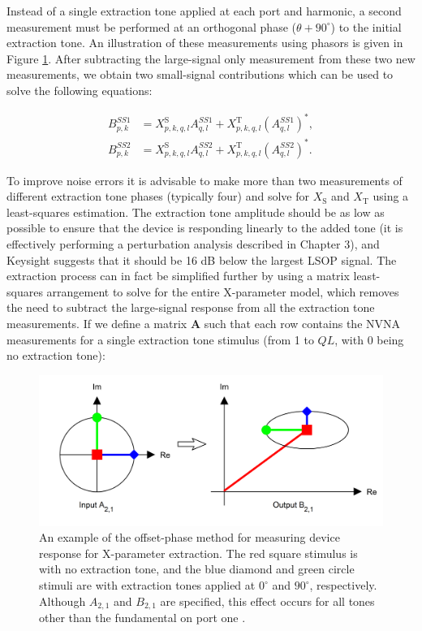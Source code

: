 \documentclass[../thesis/thesis.tex]{subfiles}
\begin{document}
\begin{refsection}
Instead of a single extraction tone applied at each port and harmonic, a second measurement must be performed at an orthogonal phase ($\theta+90^{\circ}$) to the initial extraction tone. An illustration of these measurements using phasors is given in Figure \ref{ch5_fig_extract}. After subtracting the large-signal only measurement from these two new measurements, we obtain two small-signal contributions which can be used to solve the following equations:

\begin{align}
	B^{SS1}_{p,k} &= X^\textrm{S}_{p,k,q,l}A^{SS1}_{q,l} + X^\textrm{T}_{p,k,q,l}(A^{SS1}_{q,l})^*, \\
	B^{SS2}_{p,k} &= X^\textrm{S}_{p,k,q,l}A^{SS2}_{q,l} + X^\textrm{T}_{p,k,q,l}(A^{SS2}_{q,l})^*.
\end{align}

To improve noise errors it is advisable to make more than two measurements of different extraction tone phases (typically four) and solve for $X_\textrm{S}$ and $X_\textrm{T}$ using a least-squares estimation. The extraction tone amplitude should be as low as possible to ensure that the device is responding linearly to the added tone (it is effectively performing a perturbation analysis described in Chapter 3), and Keysight suggests that it should be 16 dB below the largest LSOP signal. The extraction process can in fact be simplified further by using a matrix least-squares arrangement to solve for the entire X-parameter model, which removes the need to subtract the large-signal response from all the extraction tone measurements. If we define a matrix $\bm{A}$ such that each row contains the NVNA measurements for a single extraction tone stimulus (from 1 to $QL$, with 0 being no extraction tone):

\begin{figure}
	\centering
	\includegraphics[width=\textwidth]{extract}
	\caption[Offset-phase X-parameter extraction procedure.]{An example of the offset-phase method for measuring device response for X-parameter extraction. The red square stimulus is with no extraction tone, and the blue diamond and green circle stimuli are with extraction tones applied at $0^{\circ}$ and $90^{\circ}$, respectively. Although $A_{2,1}$ and $B_{2,1}$ are specified, this effect occurs for all tones other than the fundamental on port one \cite{Verspecht_2006}.}
	\label{ch5_fig_extract}
\end{figure}


\end{refsection}
\end{document}
